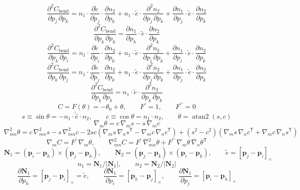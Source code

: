 \[ \frac{\partial^2 C_{\mathrm{bend}}}{\partial p_{j}\,\partial p_{k}} = n_1 \cdot \frac{\partial \tilde{e}}{\partial p_{j}} \cdot \frac{\partial n_2}{\partial p_{k}} + n_1 \cdot \tilde{e} \cdot \frac{\partial^{2} n_2}{\partial p_{j}\,\partial p_{k}} + \frac{\partial n_1}{\partial p_{j}} \cdot \tilde{e} \cdot \frac{\partial n_2}{\partial p_{k}} \]
\[ \frac{\partial^2 C_{\mathrm{bend}}}{\partial p_{k}\,\partial p_{h}} = \frac{\partial n_1}{\partial p_{h}} \cdot \tilde{e} \cdot \frac{\partial n_2}{\partial p_{k}} \]
\[ \frac{\partial^2 C_{\mathrm{bend}}}{\partial p_{k}\,\partial p_{i}} = n_1 \cdot \frac{\partial \tilde{e}}{\partial p_{i}} \cdot \frac{\partial n_2}{\partial p_{k}} + n_1 \cdot \tilde{e} \cdot \frac{\partial^{2} n_2}{\partial p_{i}\,\partial p_{k}} + \frac{\partial n_1}{\partial p_{i}} \cdot \tilde{e} \cdot \frac{\partial n_2}{\partial p_{k}} \]
\[ \frac{\partial^2 C_{\mathrm{bend}}}{\partial p_{k}\,\partial p_{j}} = n_1 \cdot \frac{\partial \tilde{e}}{\partial p_{j}} \cdot \frac{\partial n_2}{\partial p_{k}} + n_1 \cdot \tilde{e} \cdot \frac{\partial^{2} n_2}{\partial p_{j}\,\partial p_{k}} + \frac{\partial n_1}{\partial p_{j}} \cdot \tilde{e} \cdot \frac{\partial n_2}{\partial p_{k}} \]
\[ \frac{\partial^2 C_{\mathrm{bend}}}{\partial p_{k}\,\partial p_{k}} = n_1 \cdot \tilde{e} \cdot \frac{\partial^{2} n_2}{\partial p_{k}\,\partial p_{k}} \]
\[ C = F(\theta) = - \theta_0 + \theta,\qquad F^\prime = 1,\qquad F^{\prime\prime} = 0 \]
\[ s \equiv \sin\theta = - n_1 \cdot \tilde{\hat{e}} \cdot n_2,\qquad c \equiv \cos\theta = n_1 \cdot n_2,\qquad \theta = \operatorname{atan2}(s, c) \]
\[ \nabla_m \theta = c\,\nabla_m s - s\,\nabla_m c \]
\[ \nabla^2_{mn} \theta = c\,\nabla^2_{mn} s - s\,\nabla^2_{mn} c - 2sc\left(\nabla_m s\,\nabla_n s^{\mathsf T} - \nabla_m c\,\nabla_n c^{\mathsf T}\right) + (s^2 - c^2)\left(\nabla_m s\,\nabla_n c^{\mathsf T} + \nabla_m c\,\nabla_n s^{\mathsf T}\right) \]
\[ \nabla_m C = F^\prime\,\nabla_m\theta,\qquad \nabla^2_{mn} C = F^\prime\,\nabla^2_{mn}\theta + F^{\prime\prime}\,\nabla_m\theta\,\nabla_n\theta^{\mathsf T} \]
\[ \mathbf{N}_1 = (\mathbf{p}_i - \mathbf{p}_h)\times(\mathbf{p}_j - \mathbf{p}_h),\qquad \mathbf{N}_2 = (\mathbf{p}_j - \mathbf{p}_k)\times(\mathbf{p}_i - \mathbf{p}_k),\qquad \tilde{e} = [\mathbf{p}_j - \mathbf{p}_i]_\times \]
\[ n_1 = \mathbf{N}_1/|\mathbf{N}_1|,\qquad n_2 = \mathbf{N}_2/|\mathbf{N}_2| \]
\[ \frac{\partial \mathbf{N}_1}{\partial p_h} = [\mathbf{p}_j - \mathbf{p}_i]_\times = \tilde{e},\qquad \frac{\partial \mathbf{N}_1}{\partial p_i} = [\mathbf{p}_h - \mathbf{p}_j]_\times,\qquad \frac{\partial \mathbf{N}_1}{\partial p_j} = [\mathbf{p}_i - \mathbf{p}_h]_\times \]
